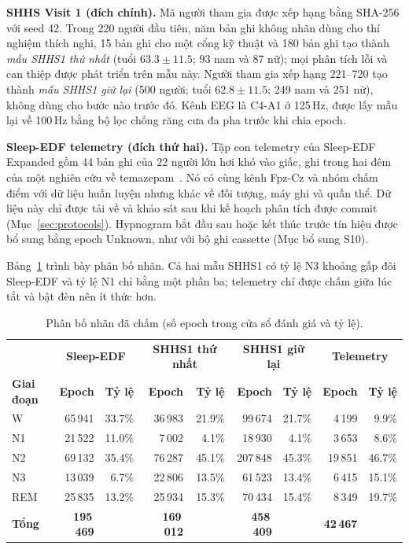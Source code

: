 \documentclass[11pt,a4paper]{article}
\begin{document}
\textbf{SHHS Visit 1 (đích chính).} Mã người tham gia được xếp hạng bằng SHA-256 với seed 42. Trong 220 người
đầu tiên, năm bản ghi không nhãn dùng cho thí nghiệm thích nghi, 15 bản ghi cho một cổng kỹ thuật và 180 bản
ghi tạo thành \emph{mẫu SHHS1 thứ nhất} (tuổi $63.3\pm11.5$; 93 nam và 87 nữ); mọi phân tích lỗi và can thiệp
được phát triển trên mẫu này. Người tham gia xếp hạng 221--720 tạo thành \emph{mẫu SHHS1 giữ lại} (500 người;
tuổi $62.8\pm11.5$; 249 nam và 251 nữ), không dùng cho bước nào trước đó. Kênh EEG là C4-A1 ở 125\,Hz, được lấy
mẫu lại về 100\,Hz bằng bộ lọc chống răng cưa đa pha trước khi chia epoch.

\textbf{Sleep-EDF telemetry (đích thứ hai).} Tập con telemetry của Sleep-EDF Expanded gồm 44 bản ghi của 22
người lớn hơi khó vào giấc, ghi trong hai đêm của một nghiên cứu về temazepam~\cite{kemp2000sleepEDF}. Nó có
cùng kênh Fpz-Cz và nhóm chấm điểm với dữ liệu huấn luyện nhưng khác về đối tượng, máy ghi và quần thể. Dữ liệu
này chỉ được tải về và khảo sát sau khi kế hoạch phân tích được commit (Mục~\ref{sec:protocols}). Hypnogram bắt
đầu sau hoặc kết thúc trước tín hiệu được bổ sung bằng epoch Unknown, như với bộ ghi cassette (Mục bổ sung S10).

Bảng~\ref{tab:class-distribution} trình bày phân bố nhãn. Cả hai mẫu SHHS1 có tỷ lệ N3 khoảng gấp đôi
Sleep-EDF và tỷ lệ N1 chỉ bằng một phần ba; telemetry chỉ được chấm giữa lúc tắt và bật đèn nên ít thức hơn.

\begin{table}[H]
\centering
\caption{Phân bố nhãn đã chấm (số epoch trong cửa sổ đánh giá và tỷ lệ).}
\label{tab:class-distribution}
\small
\begin{tabular}{lrr|rr|rr|rr}
\toprule
& \multicolumn{2}{c|}{\textbf{Sleep-EDF}} & \multicolumn{2}{c|}{\textbf{SHHS1 thứ nhất}} & \multicolumn{2}{c|}{\textbf{SHHS1 giữ lại}} & \multicolumn{2}{c}{\textbf{Telemetry}} \\
\textbf{Giai đoạn} & \textbf{Epoch} & \textbf{Tỷ lệ} & \textbf{Epoch} & \textbf{Tỷ lệ} & \textbf{Epoch} & \textbf{Tỷ lệ} & \textbf{Epoch} & \textbf{Tỷ lệ} \\
\midrule
W   & 65\,941 & 33.7\% & 36\,983 & 21.9\% & 99\,674  & 21.7\% & 4\,199  & 9.9\% \\
N1  & 21\,522 & 11.0\% & 7\,002  & 4.1\%  & 18\,930  & 4.1\%  & 3\,653  & 8.6\% \\
N2  & 69\,132 & 35.4\% & 76\,287 & 45.1\% & 207\,848 & 45.3\% & 19\,851 & 46.7\% \\
N3  & 13\,039 & 6.7\%  & 22\,806 & 13.5\% & 61\,523  & 13.4\% & 6\,415  & 15.1\% \\
REM & 25\,835 & 13.2\% & 25\,934 & 15.3\% & 70\,434  & 15.4\% & 8\,349  & 19.7\% \\
\midrule
\textbf{Tổng} & \textbf{195\,469} & & \textbf{169\,012} & & \textbf{458\,409} & & \textbf{42\,467} & \\
\bottomrule
\end{tabular}
\end{table}
\end{document}
